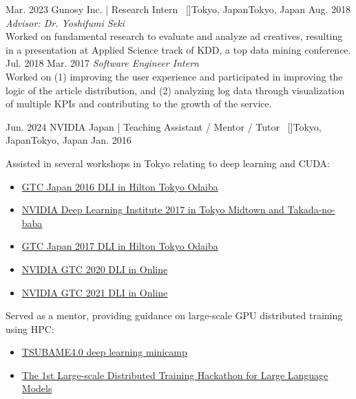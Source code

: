 \begin{experiences}
    \emptySeparator
    \researchexperience
    {Mar. 2023}   {Gunosy Inc. | Research Intern{\normalfont  ~ [\href{https://gunosy.co.jp/en/}{\small{\websiteSymbol}}]}}{Tokyo, Japan}{Tokyo, Japan}
    {Aug. 2018} {\textit{Advisor: Dr. Yoshifumi Seki}\\
    Worked on fundamental research to evaluate and analyze ad creatives, resulting in a presentation at Applied Science track of KDD, a top data mining conference.
    \vskip 0.1cm
    }
    \researchexperience
    {Jul. 2018}   {}{}{}
    {Mar. 2017} {\textit{Software Engineer Intern}\\
        Worked on (1) improving the user experience and participated in improving the logic of the article distribution, and (2) analyzing log data through visualization of multiple KPIs and contributing to the growth of the service.
    }


    \emptySeparator
    \researchexperience
    {Jun. 2024}   {NVIDIA Japan | Teaching Assistant / Mentor / Tutor{\normalfont  ~ [\href{https://www.nvidia.com/ja-jp/}{\small{\websiteSymbol}}]}}{Tokyo, Japan}{Tokyo, Japan}
    {Jan. 2016} {
    Assisted in several workshops in Tokyo relating to deep learning and CUDA:
    \begin{itemize}
        \item \href{https://nvidia.connpass.com/event/39743/}{GTC Japan 2016 DLI in Hilton Tokyo Odaiba}
        \item \href{https://nvidia.connpass.com/event/54780/}{NVIDIA Deep Learning Institute 2017 in Tokyo Midtown and Takada-no-baba}
        \item \href{https://nvidia.connpass.com/event/68912/}{GTC Japan 2017 DLI in Hilton Tokyo Odaiba}
        \item \href{https://nvidia.connpass.com/event/189637/}{NVIDIA GTC 2020 DLI in Online}
        \item \href{https://nvidia.connpass.com/event/208506/}{NVIDIA GTC 2021 DLI in Online}
    \end{itemize}
    \vskip 0.1cm

    Served as a mentor, providing guidance on large-scale GPU distributed training using HPC:
    \begin{itemize}
        \item \href{https://www.t4.gsic.titech.ac.jp/minicamp-dl-202406}{TSUBAME4.0 deep learning minicamp}
        \item \href{https://abci.ai/event/2023/06/13/ja_event.html}{The 1st Large-scale Distributed Training Hackathon for Large Language Models}
    \end{itemize}
    }


\end{experiences}
